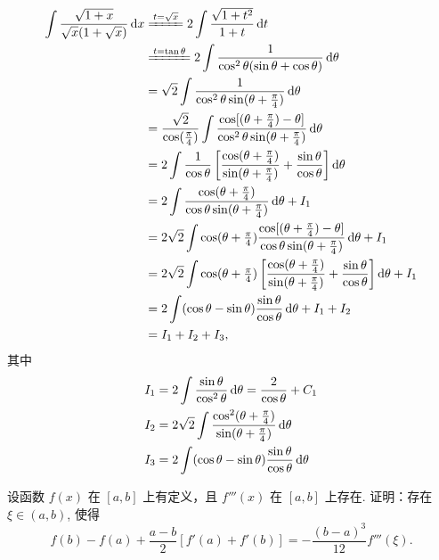 \begin{align*}
    \int \frac{\sqrt{1 + x}}{\sqrt{x} (1 + \sqrt{x})} \dx
    &\xlongequal{t = \sqrt{x}} 2\int \frac{\sqrt{1 + t^2}}{1 + t} \dt \\
    &\xlongequal{t = \tan \theta} 2\int \frac{1}{\cos^2 \theta (\sin\theta + \cos\theta)} \dif \theta \\
    &= \sqrt{2} \int \frac{1}{\cos^2 \theta \sin(\theta + \frac \pi4)} \dif \theta \\
    &= \frac{\sqrt{2}}{\cos(\frac \pi4)} \int \frac{\cos[(\theta + \frac \pi4) - \theta]}{\cos^2 \theta \sin(\theta + \frac \pi4)} \dif \theta \\
    &= 2 \int \frac{1}{\cos\theta} 
        \sbr[3]{\frac{\cos(\theta + \frac \pi4)}{\sin(\theta + \frac \pi4)}
            + \frac{\sin\theta}{\cos\theta}}  \dif\theta \\
    &= 2 \int \frac{\cos(\theta + \frac \pi4)}{\cos\theta \sin(\theta + \frac \pi4)} \dif\theta + I_1 \\
    &= 2\sqrt{2} \int \cos(\theta + \tfrac \pi4) \frac{\cos[(\theta + \frac \pi4) - \theta]}{\cos\theta \sin(\theta + \frac \pi4)} \dif\theta 
        + I_1\\
    &= 2\sqrt{2} \int \cos(\theta + \tfrac \pi4) 
        \sbr[3]{\frac{\cos(\theta + \frac \pi4)}{\sin(\theta + \frac \pi4)}
                + \frac{\sin\theta}{\cos\theta}} \dif\theta 
                + I_1\\
    &= 2 \int (\cos\theta - \sin\theta) \frac{\sin\theta}{\cos\theta} \dif\theta 
                    + I_1 + I_2\\
    &= I_1 + I_2 + I_3,
\end{align*}
其中
\begin{align*}
    I_1 &= 2 \int \frac{\sin\theta}{\cos^2\theta} \mathop{}\!\mathrm{d}\theta = \frac{2}{\cos\theta} + C_1\\
    I_2 &= 2\sqrt{2} \int \frac{\cos^2(\theta + \frac \pi4)}{\sin(\theta + \frac \pi4)} \mathop{}\!\mathrm{d}\theta \\
    I_3 &= 2 \int (\cos\theta - \sin\theta) \frac{\sin\theta}{\cos\theta} \mathop{}\!\mathrm{d}\theta
\end{align*}

\begin{exercise}
    设函数 $f(x)$ 在 $[a, b]$ 上有定义，且 $f'''(x)$ 在 $[a, b]$ 上存在. 证明：存在 $\xi \in (a, b)$, 使得
    \[
        f(b) - f(a) + \frac{a - b}{2} [f'(a) + f'(b)]
        = -\frac{(b - a)^3}{12} f'''(\xi).
    \]
\end{exercise}

